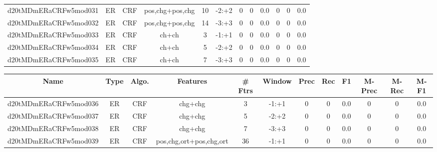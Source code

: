 \documentclass[a4paper]{article}
\begin{document}
\begin{landscape}
\begin{center}
\begin{tabular}{ |c|c|c|c|c|c|c|c|c|c|c|c|}
 
 	
 	\small{ d20tMDmERaCRFw5mod031 } & ER & CRF & pos,chg+pos,chg  &  10 &  -2:+2  &  0 & 0 & 0.0  &  0 & 0 & 0.0 \\
 	

 
 	
 	\small{ d20tMDmERaCRFw5mod032 } & ER & CRF & pos,chg+pos,chg  &  14 &  -3:+3  &  0 & 0 & 0.0  &  0 & 0 & 0.0 \\
 	

 
 	
 	\small{ d20tMDmERaCRFw5mod033 } & ER & CRF & ch+ch  &  3 &  -1:+1  &  0 & 0 & 0.0  &  0 & 0 & 0.0 \\
 	

 
 	
 	\small{ d20tMDmERaCRFw5mod034 } & ER & CRF & ch+ch  &  5 &  -2:+2  &  0 & 0 & 0.0  &  0 & 0 & 0.0 \\
 	

 
 	
 	\small{ d20tMDmERaCRFw5mod035 } & ER & CRF & ch+ch  &  7 &  -3:+3  &  0 & 0 & 0.0  &  0 & 0 & 0.0 \\
 	
 \hline
\end{tabular}
\end{center}




\begin{center}
\begin{tabular}{ |c|c|c|c|c|c|c|c|c|c|c|c|} 
 \hline
 	Name & Type & Algo. & Features & \# Ftrs & Window & Prec & Rec & F1 & M-Prec & M-Rec & M-F1\\
 \hline

 	

 
 	
 	\small{ d20tMDmERaCRFw5mod036 } & ER & CRF & chg+chg  &  3 &  -1:+1  &  0 & 0 & 0.0  &  0 & 0 & 0.0 \\
 	

 
 	
 	\small{ d20tMDmERaCRFw5mod037 } & ER & CRF & chg+chg  &  5 &  -2:+2  &  0 & 0 & 0.0  &  0 & 0 & 0.0 \\
 	

 
 	
 	\small{ d20tMDmERaCRFw5mod038 } & ER & CRF & chg+chg  &  7 &  -3:+3  &  0 & 0 & 0.0  &  0 & 0 & 0.0 \\
 	

 
 	
 	\small{ d20tMDmERaCRFw5mod039 } & ER & CRF & pos,chg,ort+pos,chg,ort  &  36 &  -1:+1  &  0 & 0 & 0.0  &  0 & 0 & 0.0 \\
 	


\end{tabular}
\end{center}
\end{landscape}
\end{document}
